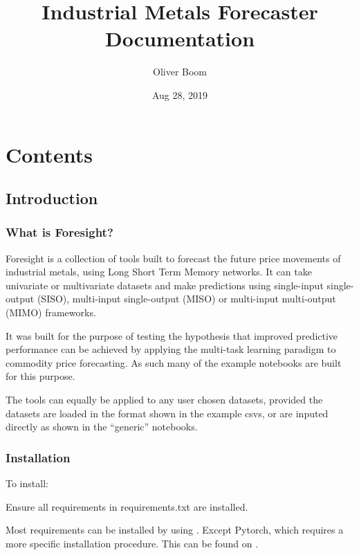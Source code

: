 \documentclass[letterpaper,10pt,english]{sphinxmanual}
\title{Industrial Metals Forecaster Documentation}
\date{Aug 28, 2019}
\author{Oliver Boom}
\begin{document}
\pagestyle{empty}
\sphinxmaketitle
\pagestyle{plain}
\sphinxtableofcontents
\pagestyle{normal}
\label{\detokenize{index::doc}}



\chapter{Contents}
\label{\detokenize{index:contents}}

\section{Introduction}
\label{\detokenize{intro:introduction}}\label{\detokenize{intro::doc}}

\subsection{What is Foresight?}
\label{\detokenize{intro:what-is-foresight}}
Foresight is a collection of tools built to forecast the future price movements of industrial metals, using Long Short Term Memory networks. It can take univariate or multivariate datasets and make predictions using single-input single-output (SISO), multi-input single-output (MISO) or multi-input multi-output (MIMO) frameworks.

It was built for the purpose of testing the hypothesis that improved predictive performance can be achieved by applying the multi-task learning paradigm to commodity price forecasting. As such many of the example notebooks are built for this purpose.

The tools can equally be applied to any user chosen datasets, provided the datasets are loaded in the format shown in the example csvs, or are inputed directly as shown in the “generic” notebooks.


\subsection{Installation}
\label{\detokenize{intro:installation}}
To install:

\begin{sphinxVerbatim}[commandchars=\\\{\}]
  
\end{sphinxVerbatim}

Ensure all requirements in requirements.txt are installed.

Most requirements can be installed by using  .
Except Pytorch, which requires a more specific installation procedure. This can be found on .
\end{document}
